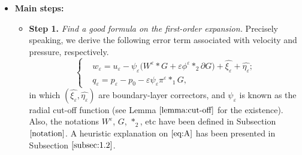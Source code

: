 \documentclass[13pt,CJK]{article}
\theoremstyle{plain}                       %
\theoremstyle{remark}
\numberwithin{equation}{section}
\begin{document}
\begin{itemize}
  \item \textbf{Main steps:}
  \begin{itemize}
    \item \textbf{Step 1.} \emph{Find a good formula on the first-order expansion.}
        Precisely speaking, we derive the following error term
        associated with velocity and pressure, respectively.
\begin{equation}\label{eq:A}
\left\{
  \begin{aligned}
&w_{\varepsilon}=u_{\varepsilon}-\psi_{\varepsilon}
\big(W^{\varepsilon}\ast G+\varepsilon
\phi^\varepsilon\ast_{2} \partial G\big)
+\hat{\xi_{\varepsilon}}
+\hat{\eta_{\varepsilon}};\\
&q_{\varepsilon}=p_\varepsilon-p_0-
\varepsilon\psi_{\varepsilon}\pi^{\varepsilon}\ast_{1} G,
\end{aligned}\right.
\end{equation}
in which $(\hat{\xi_{\varepsilon}},\hat{\eta_{\varepsilon}})$ are 
boundary-layer correctors, and $\psi_\varepsilon$ is known as the radial cut-off function (see Lemma $\ref{lemma:cut-off}$ for the existence).
Also, the notations $W^\varepsilon$, $G$, $*_2$, etc
have been defined in Subsection $\ref{notation}$. A heuristic explanation on $\eqref{eq:A}$ has been presented in Subsection $\ref{subsec:1.2}$.


\end{itemize}
\end{itemize}
\end{document}

